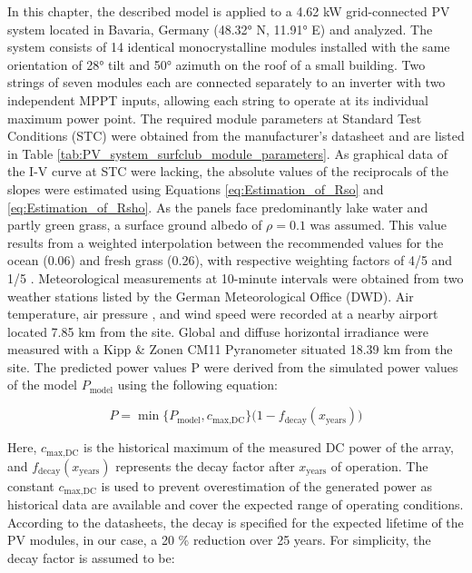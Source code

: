 
In this chapter, the described model is applied to a 4.62 kW grid-connected
PV system located in Bavaria, Germany (48.32° N, 11.91° E) and analyzed. The system
consists of 14 identical monocrystalline modules installed
with the same orientation of 28° tilt and 50° azimuth on the roof of a
small building. Two strings of seven modules each are connected separately
to an inverter with two independent MPPT inputs, allowing each string to
operate at its individual maximum power point. The required module parameters
at Standard Test Conditions (STC) were obtained from the manufacturer's datasheet
and are listed in Table \ref{tab:PV_system_surfclub_module_parameters}.
As graphical data of the I-V curve at STC were lacking, the absolute
values of the reciprocals of the slopes were estimated using Equations
\ref{eq:Estimation_of_Rso} and \ref{eq:Estimation_of_Rsho}. As
the panels face predominantly lake water and partly
green grass, a surface ground albedo of \(\rho = 0.1\) was assumed.
This value results from a weighted interpolation between the
recommended values for the ocean (0.06) and fresh grass (0.26),
with respective weighting factors of 4/5 and 1/5 \cite{OceanAlbedoWebsite}.
Meteorological measurements at 10-minute intervals were obtained from
two weather stations listed by the German Meteorological Office (DWD).
Air temperature, air pressure \cite{DWD_munich_airport_temperature_and_pressure},
and wind speed \cite{DWD_munich_airport_wind_speed} were recorded at a
nearby airport located 7.85 km from the site. Global and diffuse
horizontal irradiance \cite{DWD_weiherstephan_irradiance} were
measured with a Kipp \& Zonen CM11 Pyranometer situated 18.39 km from
the site. The predicted power values P were derived from the simulated
power values of the model \(P_{\text{model}}\) using the following equation:

\begin{equation}
    P = \min \bigl\{ P_{\text{model}}, c_{\text{max,DC}} \bigr\} \bigl(1 - f_{\text{decay}}(x_{\text{years}})\bigr)
    \label{eq:Power_prediction_from_the_model_output}
\end{equation}

\noindent
Here, \(c_{\text{max,DC}}\) is the historical maximum of the
measured DC power of the array, and \(f_{\text{decay}}(x_{\text{years}})\)
represents the decay factor after \(x_{\text{years}}\) of operation.
The constant \(c_{\text{max,DC}}\) is used to prevent overestimation of the
generated power as historical data are available and cover the
expected range of operating conditions. According to the datasheets,
the decay is specified for the expected lifetime of the PV modules,
in our case, a 20 \% reduction over 25 years. For simplicity, the decay factor
is assumed to be:

